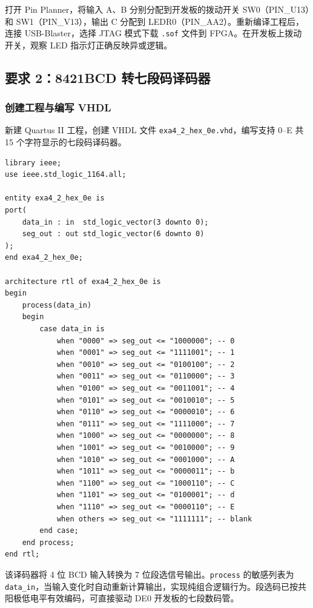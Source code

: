 \documentclass{ctexrep}
\begin{document}
打开 Pin Planner，将输入 A、B 分别分配到开发板的拨动开关 SW0（PIN\_U13）和 SW1（PIN\_V13），输出 C 分配到 LEDR0（PIN\_AA2）。重新编译工程后，连接 USB-Blaster，选择 JTAG 模式下载 \texttt{.sof} 文件到 FPGA。在开发板上拨动开关，观察 LED 指示灯正确反映异或逻辑。

\subsection{要求 2：8421BCD 转七段码译码器}

\subsubsection{创建工程与编写 VHDL}

新建 Quartus II 工程，创建 VHDL 文件 \texttt{exa4\_2\_hex\_0e.vhd}，编写支持 0--E 共 15 个字符显示的七段码译码器。

\begin{verbatim}
library ieee;
use ieee.std_logic_1164.all;

entity exa4_2_hex_0e is
port(
    data_in : in  std_logic_vector(3 downto 0);
    seg_out : out std_logic_vector(6 downto 0)
);
end exa4_2_hex_0e;

architecture rtl of exa4_2_hex_0e is
begin
    process(data_in)
    begin
        case data_in is
            when "0000" => seg_out <= "1000000"; -- 0
            when "0001" => seg_out <= "1111001"; -- 1
            when "0010" => seg_out <= "0100100"; -- 2
            when "0011" => seg_out <= "0110000"; -- 3
            when "0100" => seg_out <= "0011001"; -- 4
            when "0101" => seg_out <= "0010010"; -- 5
            when "0110" => seg_out <= "0000010"; -- 6
            when "0111" => seg_out <= "1111000"; -- 7
            when "1000" => seg_out <= "0000000"; -- 8
            when "1001" => seg_out <= "0010000"; -- 9
            when "1010" => seg_out <= "0001000"; -- A
            when "1011" => seg_out <= "0000011"; -- b
            when "1100" => seg_out <= "1000110"; -- C
            when "1101" => seg_out <= "0100001"; -- d
            when "1110" => seg_out <= "0000110"; -- E
            when others => seg_out <= "1111111"; -- blank
        end case;
    end process;
end rtl;
\end{verbatim}
\label{e4:lst:hex}

该译码器将 4 位 BCD 输入转换为 7 位段选信号输出。\texttt{process} 的敏感列表为 \texttt{data\_in}，当输入变化时自动重新计算输出，实现纯组合逻辑行为。段选码已按共阳极低电平有效编码，可直接驱动 DE0 开发板的七段数码管。
\end{document}
